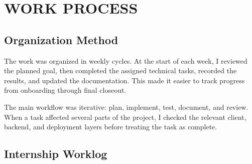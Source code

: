 \chapter{WORK PROCESS}

\section{Organization Method}

The work was organized in weekly cycles. At the start of each week, I reviewed
the planned goal, then completed the assigned technical tasks, recorded the
results, and updated the documentation. This made it easier to track progress
from onboarding through final closeout.

The main workflow was iterative: plan, implement, test, document, and review.
When a task affected several parts of the project, I checked the relevant
client, backend, and deployment layers before treating the task as complete.

\section{Internship Worklog}


